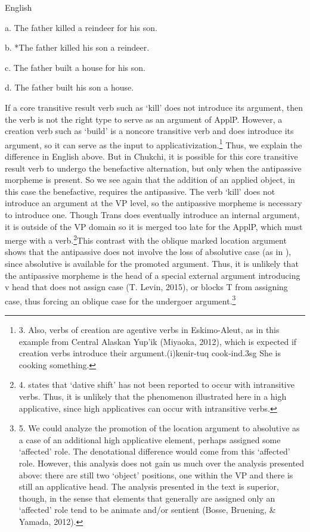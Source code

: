 \documentclass[output=paper,modfonts,nonflat]{langsci/langscibook}
\begin{document}
          English

a.  The father killed a reindeer for his son.

b.    *The father killed his son a reindeer.

c.  The father built a house for his son.

d.   The father built his son a house.

If a core transitive result verb such as ‘kill’ does not introduce its argument, then the verb is not the right type to serve as an argument of ApplP.  However, a creation verb such as ‘build’ is a noncore transitive verb and does introduce its argument, so it can serve as the input to applicativization.\footnote{3.  Also, verbs of creation are agentive verbs in Eskimo-Aleut, as in this example from Central Alaskan Yup’ik (Miyaoka, 2012), which is expected if creation verbs introduce their argument.(i)kenir-tuq      cook-\textrm{ind}.3\textrm{sg} She is cooking something.}  Thus, we explain the difference in English above.  But in Chukchi, it is possible for this core transitive result verb to undergo the benefactive alternation, but only when the antipassive morpheme is present.  So we see again that the addition of an applied object, in this case the benefactive, requires the antipassive.  The verb ‘kill’ does not introduce an argument at the VP level, so the antipassive morpheme is necessary to introduce one.  Though Trans does eventually introduce an internal argument, it is outside of the VP domain so it is merged too late for the ApplP, which must merge with a verb.\footnote{4.  \citet{Spencer1995} states that ‘dative shift’ has not been reported to occur with intransitive verbs.  Thus, it is unlikely that the phenomenon illustrated here in a high applicative, since high applicatives can occur with intransitive verbs.}This contrast with the oblique marked location argument shows that the antipassive does not involve the loss of absolutive case (as in \citealt{Baker1988}), since absolutive is available for the promoted argument.  Thus, it is unlikely that the antipassive morpheme is the head of a special external argument introducing v head that does not assign case (T. Levin, 2015), or blocks T from assigning case, thus forcing an oblique case for the undergoer argument.\footnote{5.  We could analyze the promotion of the location argument to absolutive as a case of an additional high applicative element, perhaps assigned some ‘affected’ role.   The denotational difference would come from this ‘affected’ role. However, this analysis does not gain us much over the analysis presented above: there are still two ‘object’ positions, one within the VP and there is still an applicative head.  The analysis presented in the text is superior, though, in the sense that elements that generally are assigned only an ‘affected’ role tend to be animate and/or sentient (Bosse, Bruening, \& Yamada, 2012).} 
\end{document}
